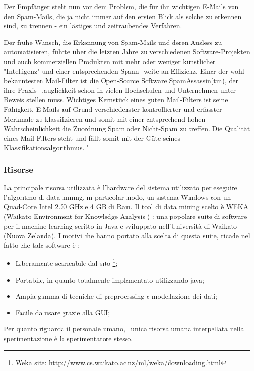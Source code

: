 Der Empfänger steht nun vor dem Problem, die für ihn wichtigen  E-Mails von den Spam-Mails, die ja nicht immer auf den ersten Blick als solche zu erkennen sind, zu trennen - ein lästiges und zeitraubendes Verfahren.

Der frühe Wunsch, die Erkennung von Spam-Mails und deren Auslese zu automatisieren, führte über die letzten Jahre zu verschiedenen Software-Projekten und auch kommerziellen Produkten mit mehr oder weniger künstlicher "Intelligenz" und einer entsprechenden Spann- weite an Effizienz. Einer der wohl bekanntesten Mail-Filter ist die Open-Source Software SpamAssassin(tm), der ihre Praxis- tauglichkeit schon in vielen Hochschulen und Unternehmen unter Beweis stellen muss. 
Wichtiges Kernstück eines guten Mail-Filters ist seine Fähigkeit, E-Mails auf Grund verschiedenster kontrollierter und erfasster Merkmale zu klassifizieren und somit mit einer entsprechend hohen Wahrscheinlichkeit die Zuordnung Spam oder Nicht-Spam zu treffen. Die Qualität eines Mail-Filters steht und fällt somit mit der Güte seines Klassifikationsalgorithmus. " 

\subsubsection{Risorse}
La principale risorsa utilizzata è l'hardware del sistema utilizzato per eseguire l'algoritmo di data mining, in particolar modo, un sistema Windows con un Quad-Core Intel 2.20 GHz e 4 GB di Ram.
Il tool di data mining scelto è WEKA (Waikato Environment for Knowledge Analysis ) \cite{WEKA}:
una popolare suite di software per il machine learning scritto in Java e sviluppato nell'Università di Waikato (Nuova Zelanda). I motivi che hanno portato alla scelta di questa suite, ricade nel fatto che tale software è :
\begin{itemize}
	\item Liberamente scaricabile dal sito \footnote{Weka site: \url{http://www.cs.waikato.ac.nz/ml/weka/downloading.html}};
    \item Portabile, in quanto totalmente implementato utilizzando java;
    \item Ampia gamma di tecniche di preprocessing e modellazione dei dati;
    \item Facile da usare grazie alla GUI;
\end{itemize}

Per quanto riguarda il personale umano, l'unica risorsa umana interpellata nella sperimentazione è lo sperimentatore stesso.

